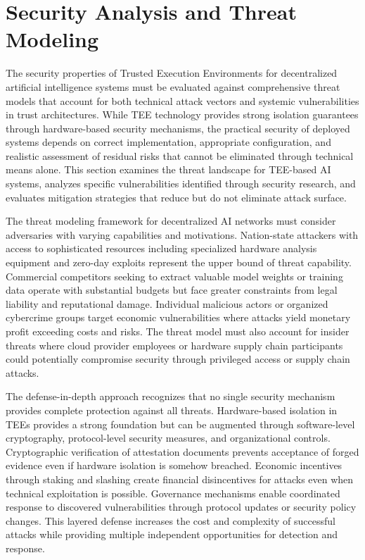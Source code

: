 \section{Security Analysis and Threat Modeling}



The security properties of Trusted Execution Environments for decentralized artificial intelligence systems must be evaluated against comprehensive threat models that account for both technical attack vectors and systemic vulnerabilities in trust architectures. While TEE technology provides strong isolation guarantees through hardware-based security mechanisms, the practical security of deployed systems depends on correct implementation, appropriate configuration, and realistic assessment of residual risks that cannot be eliminated through technical means alone. This section examines the threat landscape for TEE-based AI systems, analyzes specific vulnerabilities identified through security research, and evaluates mitigation strategies that reduce but do not eliminate attack surface.

The threat modeling framework for decentralized AI networks must consider adversaries with varying capabilities and motivations. Nation-state attackers with access to sophisticated resources including specialized hardware analysis equipment and zero-day exploits represent the upper bound of threat capability. Commercial competitors seeking to extract valuable model weights or training data operate with substantial budgets but face greater constraints from legal liability and reputational damage. Individual malicious actors or organized cybercrime groups target economic vulnerabilities where attacks yield monetary profit exceeding costs and risks. The threat model must also account for insider threats where cloud provider employees or hardware supply chain participants could potentially compromise security through privileged access or supply chain attacks.

The defense-in-depth approach recognizes that no single security mechanism provides complete protection against all threats. Hardware-based isolation in TEEs provides a strong foundation but can be augmented through software-level cryptography, protocol-level security measures, and organizational controls. Cryptographic verification of attestation documents prevents acceptance of forged evidence even if hardware isolation is somehow breached. Economic incentives through staking and slashing create financial disincentives for attacks even when technical exploitation is possible. Governance mechanisms enable coordinated response to discovered vulnerabilities through protocol updates or security policy changes. This layered defense increases the cost and complexity of successful attacks while providing multiple independent opportunities for detection and response.

